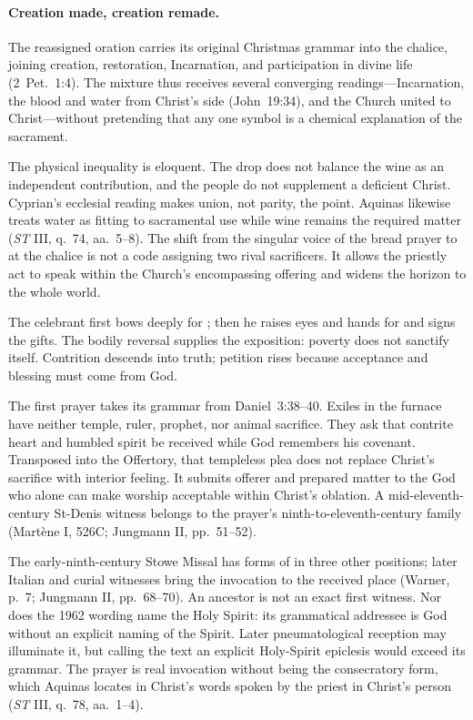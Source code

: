\paragraph{Creation made, creation remade.}

The reassigned oration carries its original Christmas grammar into the chalice, joining creation, restoration, Incarnation, and participation in divine life (2~Pet.~1:4). The mixture thus receives several converging readings---Incarnation, the blood and water from Christ's side (John~19:34), and the Church united to Christ---without pretending that any one symbol is a chemical explanation of the sacrament.

The physical inequality is eloquent. The drop does not balance the wine as an independent contribution, and the people do not supplement a deficient Christ. Cyprian's ecclesial reading makes union, not parity, the point. Aquinas likewise treats water as fitting to sacramental use while wine remains the required matter (\emph{ST} III, q.~74, aa.~5--8). The shift from the singular voice of the bread prayer to  at the chalice is not a code assigning two rival sacrificers. It allows the priestly act to speak within the Church's encompassing offering and widens the horizon to the whole world.


The celebrant first bows deeply for ; then he raises eyes and hands for  and signs the gifts. The bodily reversal supplies the exposition: poverty does not sanctify itself. Contrition descends into truth; petition rises because acceptance and blessing must come from God.

The first prayer takes its grammar from Daniel~3:38--40. Exiles in the furnace have neither temple, ruler, prophet, nor animal sacrifice. They ask that contrite heart and humbled spirit be received while God remembers his covenant. Transposed into the Offertory, that templeless plea does not replace Christ's sacrifice with interior feeling. It submits offerer and prepared matter to the God who alone can make worship acceptable within Christ's oblation. A mid-eleventh-century St-Denis witness belongs to the prayer's ninth-to-eleventh-century family (Mart\`ene I, 526C; Jungmann II, pp.~51--52).

The early-ninth-century Stowe Missal has forms of  in three other positions; later Italian and curial witnesses bring the invocation to the received place (Warner, p.~7; Jungmann II, pp.~68--70). An ancestor is not an exact first witness. Nor does the 1962 wording name the Holy Spirit: its grammatical addressee is God without an explicit naming of the Spirit. Later pneumatological reception may illuminate it, but calling the text an explicit Holy-Spirit epiclesis would exceed its grammar. The prayer is real invocation without being the consecratory form, which Aquinas locates in Christ's words spoken by the priest in Christ's person (\emph{ST} III, q.~78, aa.~1--4).

